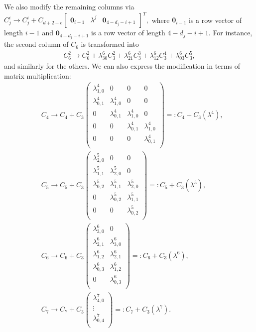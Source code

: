 \documentclass[letterpaper,11pt]{amsart}
\theoremstyle{plain}
\theoremstyle{definition}
\begin{document}
We also modify the remaining columns via $C_j^i \rightarrow C_j^i+C_{d+2-e}\begin{bmatrix}
\bm{0}_{i-1} & \lambda^j & \bm{0}_{4-d_j-i+1}  
\end{bmatrix}^T,$ where $\bm{0}_{i-1}$ is a row vector of length $i-1$ and $\bm{0}_{4-d_j-i+1}$ is a row vector of length $4-d_j-i+1.$ For instance, the second column of $C_6$ is transformed into 
\begin{align*}
C_6^2 \rightarrow C_6^2+\lambda_{30}^6C_3^2+\lambda_{21}^6 C_3^3 + \lambda_{12}^6 C_3^4 + \lambda_{03}^6 C_3^5,  
\end{align*}
and similarly for the others. We can also express the modification in terms of matrix multiplication: \begin{align*}
   & C_4 \rightarrow C_4+C_3\begin{pmatrix}
        \lambda^4_{1,0} & 0 & 0 & 0\\
        \lambda^4_{0,1} & \lambda^4_{1,0} & 0 & 0\\
        0 & \lambda^4_{0,1} & \lambda^4_{1,0} & 0\\
        0 & 0 & \lambda^4_{0,1} & \lambda^4_{1,0}\\
         0 & 0 & 0 & \lambda^4_{0,1}\\
    \end{pmatrix}=:C_4+C_3(\lambda^4), \\ &C_5 \rightarrow C_5+C_3\begin{pmatrix}
        \lambda^5_{2,0} & 0 & 0 \\
        \lambda^5_{1,1} & \lambda^5_{2,0} & 0 \\
        \lambda^5_{0,2} & \lambda^5_{1,1} & \lambda^5_{2,0} \\
        0 & \lambda^5_{0,2}& \lambda^5_{1,1} \\
         0 & 0 & \lambda^5_{0,2} \\
    \end{pmatrix}=:C_5+C_3(\lambda^5), \\
 & C_6 \rightarrow C_6+C_3\begin{pmatrix}
        \lambda^6_{3,0} & 0  \\
        \lambda^6_{2,1} & \lambda^6_{3,0}  \\
        \lambda^6_{1,2} & \lambda^6_{2,1}  \\
        \lambda^6_{0,3} & \lambda^6_{1,2} \\
         0 & \lambda^6_{0,3}  \\
    \end{pmatrix}=:C_6+C_3(\lambda^6), \\   &C_7 \rightarrow C_7+C_3\begin{pmatrix}
        \lambda^7_{4,0}  \\
        \vdots  \\
        \lambda^7_{0,4}  \\
    \end{pmatrix}=:C_7+C_3(\lambda^7).
\end{align*}
\end{document}
